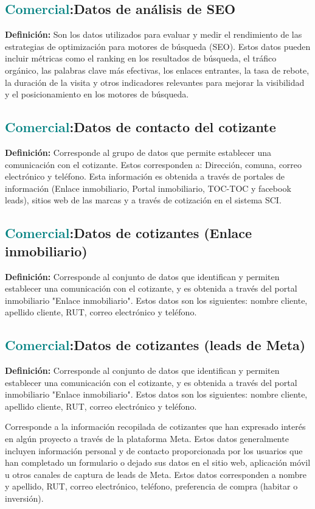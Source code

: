 \documentclass[12pt]{article}
\begin{document}
\subsection{\textcolor{teal}{Comercial}:{Datos de análisis de SEO}}
\textbf{Definición:} Son los datos utilizados para evaluar y medir el rendimiento de las estrategias de optimización para motores de búsqueda (SEO). Estos datos pueden incluir métricas como el ranking en los resultados de búsqueda, el tráfico orgánico, las palabras clave más efectivas, los enlaces entrantes, la tasa de rebote, la duración de la visita y otros indicadores relevantes para mejorar la visibilidad y el posicionamiento en los motores de búsqueda.
\subsection{\textcolor{teal}{Comercial}:{Datos de contacto del cotizante}}
\textbf{Definición:} Corresponde al grupo de datos que permite establecer una comunicación con el cotizante. Estos corresponden a: Dirección, comuna, correo electrónico y teléfono. Esta información es obtenida a través de portales de información (Enlace inmobiliario, Portal inmobiliario, TOC-TOC y facebook leads), sitios web de las marcas y a través de cotización en el sistema SCI.
\subsection{\textcolor{teal}{Comercial}:{Datos de cotizantes (Enlace inmobiliario)}}
\textbf{Definición:} Corresponde al conjunto de datos que identifican y permiten establecer una comunicación con el cotizante, y es obtenida a través del portal inmobiliario "Enlace inmobiliario". Estos datos son los siguientes: nombre cliente, apellido cliente, RUT, correo electrónico y teléfono.
\subsection{\textcolor{teal}{Comercial}:{Datos de cotizantes (leads de Meta)}}
\textbf{Definición:} Corresponde al conjunto de datos que identifican y permiten establecer una comunicación con el cotizante, y es obtenida a través del portal inmobiliario "Enlace inmobiliario". Estos datos son los siguientes: nombre cliente, apellido cliente, RUT, correo electrónico y teléfono.

Corresponde a la información recopilada de cotizantes que han expresado interés en algún proyecto a través de la plataforma Meta. Estos datos generalmente incluyen información personal y de contacto proporcionada por los usuarios que han completado un formulario o dejado sus datos en el sitio web, aplicación móvil u otros canales de captura de leads de Meta. Estos datos corresponden a nombre y apellido, RUT, correo electrónico, teléfono, preferencia de compra (habitar o inversión).
\end{document}

